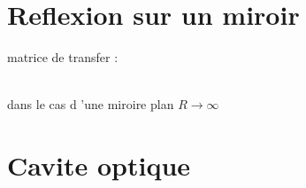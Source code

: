 \documentclass[12pt]{book}
\begin{document}
        \section{Reflexion sur un miroir}
            matrice de transfer :
            \begin{center}
                 \\ dans le cas d 'une miroire plan $R \to \infty$
            \end{center} 
    \section{Cavite optique}
\end{document}

